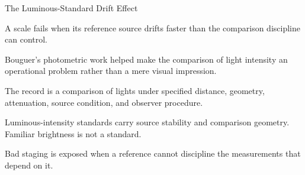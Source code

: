 \begin{phenom}{The Luminous-Standard Drift Effect~\cite{bouguer1729}}
\label{ph:luminous-standard-drift}

\PhStatement
A scale fails when its reference source drifts faster than the comparison
discipline can control.

\PhOrigin
Bouguer's photometric work helped make the comparison of light intensity an
operational problem rather than a mere visual impression.

\PhObservation
The record is a comparison of lights under specified distance, geometry,
attenuation, source condition, and observer procedure.

\PhConstraint
Luminous-intensity standards carry source stability and comparison geometry.
Familiar brightness is not a standard.

\PhConsequence
Bad staging is exposed when a reference cannot discipline the measurements
that depend on it.
\end{phenom}

